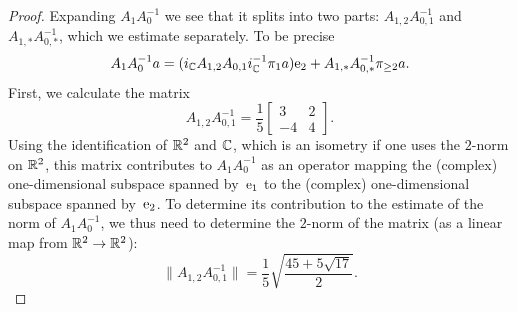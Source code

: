 \begin{proof}
Expanding $A_1A_{0}^{-1}$ we see that it splits into two parts: $A_{1,2} A_{0,1}^{-1}$ and $A_{1,*}     A_{0,*}^{-1}$, which we estimate separately. To be precise
\[
  A_1A_{0}^{-1} a = (i_{\mathbb{C}} A_{1,2} A_{0,1} i_{\mathbb{C}}^{-1} \pi_1 a) \mathrm{e}_2 
                    +  A_{1,*} A_{0,*}^{-1} \pi_{\ge 2} a.
\]
First, we calculate the matrix
\[
  A_{1,2} A_{0,1}^{-1}  = 
   \frac{1}{5}
  \left[
  \begin{matrix}
  3 & 2 \\
  -4  & 4 
  \end{matrix} 
  \right] .
\]
Using the identification of $\mathbb{R}^2$ and $\mathbb{C}$, which is an isometry if one uses the $2$-norm on $\mathbb{R}^2$,
this matrix contributes to $A_1 A_0^{-1}$
as an operator mapping the (complex) one-dimensional subspace spanned by~$\mathrm{e}_1$ to the (complex) one-dimensional subspace spanned by~$\mathrm{e}_2$. 
To determine its contribution to the estimate of the norm of $A_1 A_0^{-1}$,
we thus need to determine the $2$-norm of the matrix (as a linear map from $\mathbb{R}^2 \to \mathbb{R}^2$):
\[
  \| A_{1,2} A_{0,1}^{-1} \|  = \frac{1}{5} \sqrt{\frac{45+5\sqrt{17}}{2}}.
\]

\end{proof}
